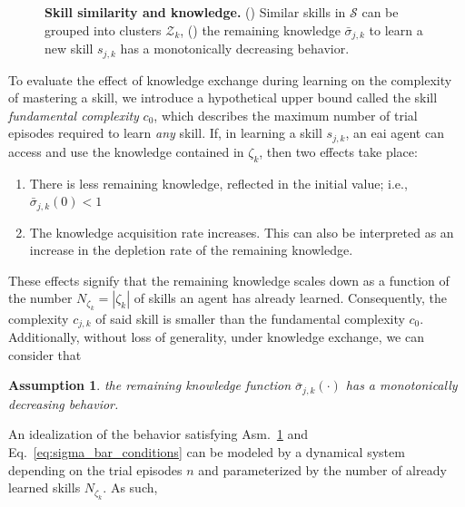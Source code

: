\documentclass[12pt]{article}
\renewcommand{\emph}[1]{\textit{#1}}
\newtheorem{assumption}{Assumption}
\begin{document}
\begin{figure}[!t]
\begin{subfigure}[t]{7.5cm}
	\end{subfigure}
	\hspace*{\fill}
	\caption[] {\label{fig:experimental_results} \textbf{Skill similarity and knowledge.} () Similar skills in $\mathcal{S}$ can be grouped into clusters $\mathcal{Z}_k$, () the remaining knowledge $\bar{\sigma}_{j,k}$ to learn a new skill $s_{j,k}$ has a monotonically decreasing behavior.}	
\end{figure}
To evaluate the effect of knowledge exchange during learning on the complexity of mastering a skill, we introduce a hypothetical upper bound called the skill \textit{fundamental complexity} $c_0$, which describes the maximum number of trial episodes required to learn \emph{any} skill. If, in learning a skill $ s_{j,k} $, an \ac{eai} agent can access and use the knowledge contained in $\mathcal{\zeta}_k$, then two effects take place:
\begin{enumerate}
	\item There is less remaining knowledge, reflected in the initial value; i.e., $\bar{\sigma}_{j,k}(0) < 1$
	\item The knowledge acquisition rate increases. This can also be interpreted as an increase in the depletion rate of the remaining knowledge.
\end{enumerate}
These effects signify that the remaining knowledge scales down as a function of the number $N_{\zeta_k}=|\mathcal{\zeta}_k|$ of skills an agent has already learned. Consequently, the complexity $c_{j,k}$ of said skill is smaller than the fundamental complexity $c_0$. Additionally, without loss of generality, under knowledge exchange, we can consider that
\begin{tcolorbox}
	\begin{assumption}\label{assumption:exponential_decrease} the remaining knowledge function $\bar{\sigma}_{j,k}(\cdot)$ has a monotonically decreasing behavior.
	\end{assumption}
\end{tcolorbox} 
\noindent An idealization of the behavior satisfying Asm.~\ref{assumption:exponential_decrease} and Eq.~\eqref{eq:sigma_bar_conditions} can be modeled by a dynamical system depending on the trial episodes $n$ and parameterized by the number of already learned skills $N_{\zeta_k}$. As such,
\end{document}

